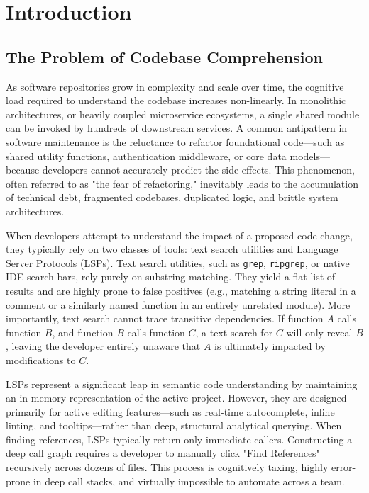\documentclass[conference]{IEEEtran}
\begin{document}
\section{Introduction}

\subsection{The Problem of Codebase Comprehension}
As software repositories grow in complexity and scale over time, the cognitive load required to understand the codebase increases non-linearly. In monolithic architectures, or heavily coupled microservice ecosystems, a single shared module can be invoked by hundreds of downstream services. A common antipattern in software maintenance is the reluctance to refactor foundational code—such as shared utility functions, authentication middleware, or core data models—because developers cannot accurately predict the side effects. This phenomenon, often referred to as "the fear of refactoring," inevitably leads to the accumulation of technical debt, fragmented codebases, duplicated logic, and brittle system architectures. 

When developers attempt to understand the impact of a proposed code change, they typically rely on two classes of tools: text search utilities and Language Server Protocols (LSPs). Text search utilities, such as \texttt{grep}, \texttt{ripgrep}, or native IDE search bars, rely purely on substring matching. They yield a flat list of results and are highly prone to false positives (e.g., matching a string literal in a comment or a similarly named function in an entirely unrelated module). More importantly, text search cannot trace transitive dependencies. If function $A$ calls function $B$, and function $B$ calls function $C$, a text search for $C$ will only reveal $B$, leaving the developer entirely unaware that $A$ is ultimately impacted by modifications to $C$.

LSPs represent a significant leap in semantic code understanding by maintaining an in-memory representation of the active project. However, they are designed primarily for active editing features—such as real-time autocomplete, inline linting, and tooltips—rather than deep, structural analytical querying. When finding references, LSPs typically return only immediate callers. Constructing a deep call graph requires a developer to manually click "Find References" recursively across dozens of files. This process is cognitively taxing, highly error-prone in deep call stacks, and virtually impossible to automate across a team.
\end{document}
